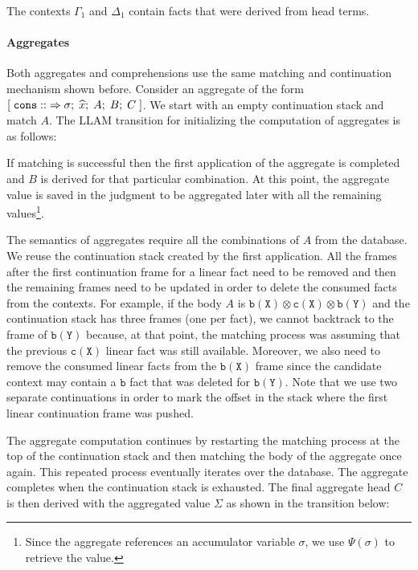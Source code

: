 The contexts $\Gamma_1$ and $\Delta_1$ contain facts that were derived from head
terms.

\paragraph{Aggregates}

Both aggregates and comprehensions use the same matching and continuation
mechanism shown before.  Consider an aggregate of the form
$[\; \mathtt{cons ::} \Rightarrow \sigma; \; \widehat{x}; \; A; \; B; \; C \;]$. We start with an
empty continuation stack and match $A$.  The LLAM transition for initializing
the computation of aggregates is as follows:

\vspace{-5mm}

\vspace{-4mm}

If matching is successful then the first application of the aggregate is
completed and $B$ is derived for that particular combination.  At this point,
the aggregate value is saved in the judgment to be aggregated later with all the
remaining values\footnote{Since the aggregate references an accumulator variable
$\sigma$, we use $\Psi(\sigma)$ to retrieve the value.}.

The semantics of aggregates require all the combinations of $A$ from
the database. We reuse the continuation stack created by the first
application. All the frames after the first continuation frame for a linear fact
need to be removed and then the remaining frames need to be updated in order to
delete the consumed facts from the contexts. For example, if the body $A$ is
$\mathtt{b(X)} \otimes \mathtt{c(X)} \otimes \mathtt{b(Y)}$ and the continuation
stack has three frames (one per fact), we cannot backtrack to the frame of
$\mathtt{b(Y)}$ because, at that point, the matching process was assuming that
the previous $\mathtt{c(X)}$ linear fact was still available.  Moreover, we also
need to remove the consumed linear facts from the $\mathtt{b(X)}$ frame
since the candidate context may contain a $\mathtt{b}$ fact that was deleted
for $\mathtt{b(Y)}$. Note that we use two separate continuations in order to
mark the offset in the stack where the first linear continuation frame was
pushed.

The aggregate computation continues by restarting the matching process at the
top of the continuation stack and then matching the body of the aggregate once
again. This repeated process eventually iterates over the database. The
aggregate completes when the continuation stack is exhausted. The final
aggregate head $C$ is then derived with the aggregated value $\Sigma$ as shown
in the transition below:

